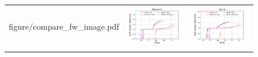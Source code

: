\begin{figure}[p]
\begin{tabular}{ccc}
\begin{minipage}[t]{0.31\hsize}
            {figure/compare_fw_image.pdf}
        \end{minipage}
        &
        \begin{minipage}[t]{0.31\hsize}
            \centering
            \includegraphics[keepaspectratio, scale=0.30]
            {figure/compare_fw_ringnorm.pdf}
        \end{minipage}
        &
        \begin{minipage}[t]{0.31\hsize}
            \centering
            \includegraphics[keepaspectratio, scale=0.30]
            {figure/compare_fw_splice.pdf}
        \end{minipage}
        \\
        \begin{minipage}[t]{0.31\hsize}
            \centering

\end{minipage}
\end{tabular}
\end{figure}
